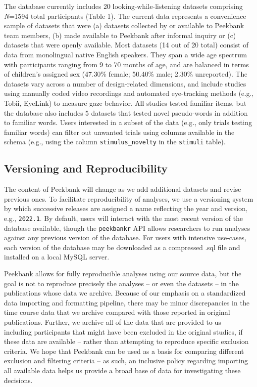 \documentclass[
  english,
  man,floatsintext]{apa6}
\begin{document}
The database currently includes 20 looking-while-listening datasets comprising \emph{N}=1594 total participants (Table 1).
The current data represents a convenience sample of datasets that were (a) datasets collected by or available to Peekbank team members, (b) made available to Peekbank after informal inquiry or (c) datasets that were openly available.
Most datasets (14 out of 20 total) consist of data from monolingual native English speakers.
They span a wide age spectrum with participants ranging from 9 to 70 months of age, and are balanced in terms of children's assigned sex (47.30\% female; 50.40\% male; 2.30\% unreported).
The datasets vary across a number of design-related dimensions, and include studies using manually coded video recordings and automated eye-tracking methods (e.g., Tobii, EyeLink) to measure gaze behavior.
All studies tested familiar items, but the database also includes 5 datasets that tested novel pseudo-words in addition to familiar words.
Users interested in a subset of the data (e.g., only trials testing familiar words) can filter out unwanted trials using columns available in the schema (e.g., using the column \texttt{stimulus\_novelty} in the \texttt{stimuli} table).

\hypertarget{versioning-and-reproducibility}{%
\subsection{Versioning and Reproducibility}\label{versioning-and-reproducibility}}

The content of Peekbank will change as we add additional datasets and revise previous ones.
To facilitate reproducibility of analyses, we use a versioning system by which successive releases are assigned a name reflecting the year and version, e.g., \texttt{2022.1}.
By default, users will interact with the most recent version of the database available, though the \texttt{peekbankr} API allows researchers to run analyses against any previous version of the database.
For users with intensive use-cases, each version of the database may be downloaded as a compressed .sql file and installed on a local MySQL server.

Peekbank allows for fully reproducible analyses using our source data, but the goal is not to reproduce precisely the analyses -- or even the datasets -- in the publications whose data we archive. Because of our emphasis on a standardized data importing and formatting pipeline, there may be minor discrepancies in the time course data that we archive compared with those reported in original publications. Further, we archive all of the data that are provided to us -- including participants that might have been excluded in the original studies, if these data are available -- rather than attempting to reproduce specific exclusion criteria. We hope that Peekbank can be used as a basis for comparing different exclusion and filtering criteria -- as such, an inclusive policy regarding importing all available data helps us provide a broad base of data for investigating these decisions.
\end{document}
